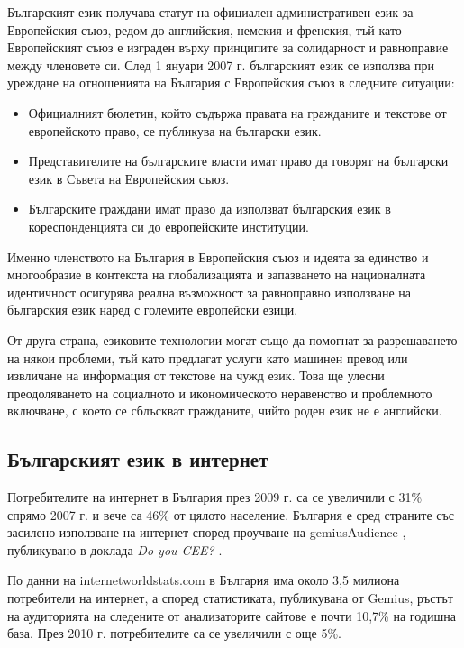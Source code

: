 \documentclass[]{../../metanetpaper}
\begin{document}
\begin{multicols}{2}
Българският език получава статут на официален административен език за Европейския съюз, редом до английския, немския и френския, тъй като Европейският съюз е изграден върху принципите за солидарност и равноправие между членовете си. След 1 януари 2007 г. българският език се използва при уреждане на отношенията на България с Европейския съюз в следните ситуации:
 
\begin{itemize}
\item Официалният бюлетин, който съдържа правата на гражданите и текстове от европейското право, се публикува на български език. 
\item Представителите на българските власти имат право да говорят на български език в Съвета на Европейския съюз. 
\item Българските граждани имат право да използват българския език в кореспонденцията си до европейските институции.
\end{itemize}

Именно членството на България в Европейския съюз и идеята за единство и многообразие в контекста на глобализацията и запазването на националната идентичност осигурява реална възможност за равноправно използване на българския език наред с големите европейски езици. 

От друга страна, езиковите технологии могат също да помогнат за разрешаването на някои проблеми, тъй като предлагат услуги като машинен превод или извличане на информация от текстове на чужд език. Това ще улесни преодоляването на социалното и икономическото неравенство и проблемното включване, с което се сблъскват гражданите, чийто роден език не е английски.


\subsection{Българският език в интернет}

Потребителите на интернет в България през 2009 г. са се увеличили с 31\% спрямо 2007 г. и вече са 46\% от цялото население. България е сред страните със засилено използване на интернет според проучване на gemiusAudience \cite{gemius}, публикувано в доклада \textit{Do you CEE?} \cite{inetcee}.
 
По данни на internetworldstats.com \cite{inetworldstat} в България има около 3,5 милиона потребители на интернет, а според статистиката, публикувана от Gemius, ръстът на аудиторията на следените от анализаторите сайтове е почти 10,7\% на годишна база. През 2010 г. потребителите са се увеличили с още 5\%. 


\end{multicols}
\end{document}

